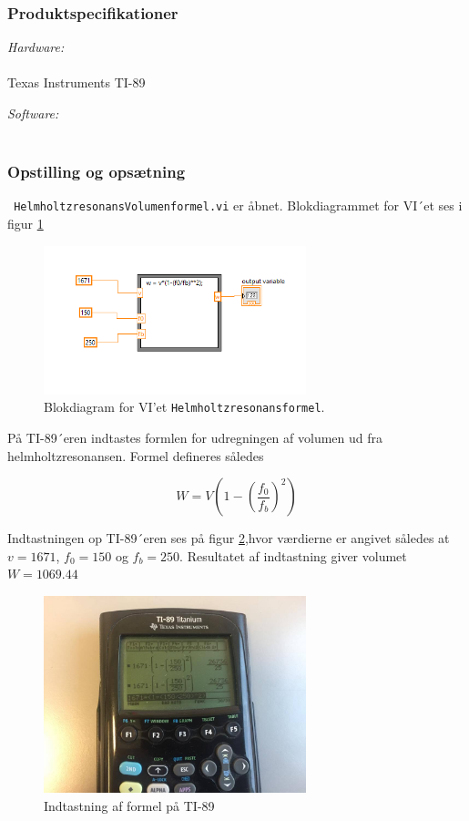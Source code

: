 		\subsubsection{Produktspecifikationer}
	
		\textit{Hardware:}\\
		\PC\\
		Texas Instruments TI-89
	
		\textit{Software:}\\
		\labview\\
	
		\subsubsection{Opstilling og opsætning}
		\texttt{ HelmholtzresonansVolumenformel.vi} er åbnet. Blokdiagrammet for VI´et ses i figur \ref{fig:HHRF} 
		
		\begin{figure}
			\centering
			\includegraphics[width=3in]{HelmholtzformelLabVIEW}
			\caption{Blokdiagram for VI'et \texttt{Helmholtzresonansformel}.}
			\label{fig:HHRF}
		\end{figure}
		
		På TI-89´eren indtastes formlen for udregningen af volumen ud fra helmholtzresonansen. Formel defineres således 
		
		\begin{equation}
		W = V\left(1-\left(\frac{f_{0}}{f_{b}}\right)^2\right)
		\end{equation}
		
		Indtastningen op TI-89´eren ses på figur \ref{fig:TI89},hvor værdierne er angivet således at $v=1671$, $f_0=150$ og $f_b=250$. Resultatet af indtastning giver volumet $W=1069.44$
		
		\begin{figure}
			\centering
			\includegraphics[width=3in]{TI-89}
			\caption{Indtastning af formel på TI-89 }
			\label{fig:TI89}
		\end{figure}
		
